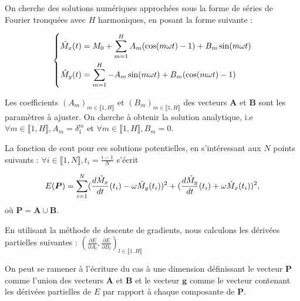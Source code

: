 \documentclass[12pt]{report}
\begin{document}
On cherche des solutions numériques approchées sous la forme de séries de Fourier tronquées avec $H$ harmoniques, en posant la forme suivante :

\begin{equation}
    \left\{
    \begin{aligned}
        \Tilde{M}_x(t) & = M_0 + \sum_{m=1}^{H} A_m (\cos(m\omega t)-1) + B_m \sin(m\omega t) \\
        \Tilde{M}_y(t) & = \sum_{m=1}^{H} -A_m \sin(m\omega t) + B_m (\cos(m\omega t)-1)
    \end{aligned}
    \right.
    \label{eq:solution_fourier_couplee_2D}
\end{equation}

Les coefficients $(A_m)_{m\in \llbracket 1,H \rrbracket}$ et $(B_m)_{m\in \llbracket 1,H \rrbracket}$ des vecteurs ${\bm A}$ et ${\bm B}$ sont les paramètres à ajuster.
On cherche à obtenir la solution analytique, i.e $\forall m \in\llbracket 1,H \rrbracket, A_m = \delta _1 ^m $ et $\forall m \in\llbracket 1,H \rrbracket, B_m = 0 $.

La fonction de cout pour ces solutions potentielles, en s'intéressant aux $N$ points suivants : $\forall i \in\llbracket 1,N \rrbracket, t_i = \frac{i-1}{N} $ s'écrit

\begin{equation}
    E(\bm{P}) = \sum_{i=1}^{N} (\frac{d\Tilde{M}_x}{dt}(t_i) - \omega \Tilde{M}_y(t_i))^2 + (\frac{d\Tilde{M}_y}{dt}(t_i) + \omega \Tilde{M}_x(t_i))^2,
    \label{eq:erreur_descente_gradient_couplees}
\end{equation}
où ${\bm P}={\bm A}\cup\bm B$.

En utilisant la méthode de descente de gradients, nous calculons les dérivées partielles suivantes :
$(\frac{\partial E}{\partial A_l}, \frac{\partial E}{\partial B_l})_{l \in \llbracket 1,H \rrbracket}$

On peut se ramener à l'écriture du cas à une dimension définissant le vecteur $\bm{P}$ comme l'union des vecteurs $\bm{A}$ et $\bm{B}$ et le vecteur $\bm{g}$ comme le vecteur contenant les dérivées partielles de $E$ par rapport à chaque composante de $\bm{P}$.
\end{document}
